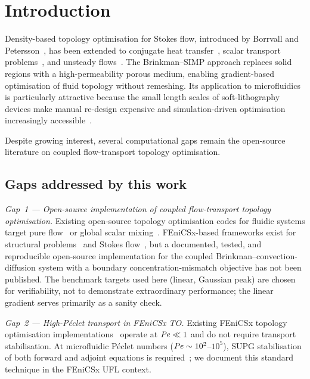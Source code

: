 \section{Introduction}
\label{sec:introduction}

Density-based topology optimisation for Stokes flow, introduced by
Borrvall and Petersson~\cite{borrvall2003}, has been extended to
conjugate heat transfer~\cite{alexandersen2014}, scalar transport
problems~\cite{makhija2015}, and unsteady flows~\cite{kreissl2011}.
The Brinkman--SIMP approach replaces solid regions with a high-permeability
porous medium, enabling gradient-based optimisation of fluid topology
without remeshing.
Its application to microfluidics is particularly attractive because the
small length scales of soft-lithography devices make manual re-design
expensive and simulation-driven optimisation increasingly accessible~\cite{whitesides2006}.

Despite growing interest, several computational gaps remain the
open-source literature on coupled flow-transport topology optimisation.

\subsection*{Gaps addressed by this work}

\emph{Gap~1 --- Open-source implementation of coupled
flow-transport topology optimisation.}
Existing open-source topology optimisation codes for fluidic systems
target pure flow~\cite{borrvall2003} or global scalar
mixing~\cite{na2022}.
FEniCSx-based frameworks exist for structural problems~\cite{dokken2023}
and Stokes flow~\cite{lazarov2016}, but a documented, tested,
and reproducible open-source implementation for the coupled
Brinkman--convection-diffusion system with a boundary
concentration-mismatch objective has not been published.
The benchmark targets used here (linear, Gaussian peak) are
chosen for verifiability, not to demonstrate extraordinary performance;
the linear gradient serves primarily as a sanity check.

\emph{Gap~2 --- High-P\'{e}clet transport in FEniCSx TO.}
Existing FEniCSx topology optimisation
implementations~\cite{dokken2023} operate at $\mathit{Pe}\ll1$
and do not require transport stabilisation.
At microfluidic P\'{e}clet numbers ($\mathit{Pe}\sim10^2$--$10^5$),
SUPG stabilisation of both forward and adjoint equations
is required~\cite{brooks1982,donea2003}; we document
this standard technique in the FEniCSx UFL context.

